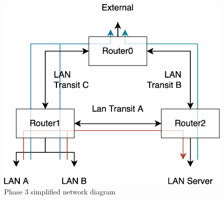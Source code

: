 \documentclass[11pt,a4paper]{report}
\begin{document}
    \begin{figure}[h]
        \centering
        \includegraphics[scale=0.40,valign=c]{diagramL250}
        \caption{Phase 3 simplified network diagram}
        \label{fig:p2netdiag}
    \end{figure}

    \pagebreak
\end{document}
